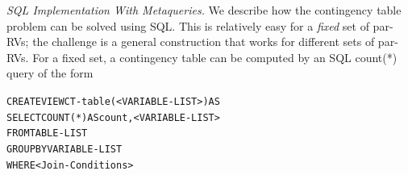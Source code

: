 {\em SQL Implementation With Metaqueries.}
We describe how the contingency table problem can be solved using SQL. %
This is relatively easy for a {\em fixed} set of par-RVs; the challenge is a general construction that works for different sets of par-RVs. For a fixed set, a  contingency table can be computed by an SQL count(*) query of the form 
%
%
\begin{alltt}
CREATE VIEW CT-table(<VARIABLE-LIST>) AS
SELECT COUNT(*) AS count, <VARIABLE-LIST>
FROM TABLE-LIST
GROUP BY VARIABLE-LIST
WHERE <Join-Conditions>
\end{alltt}

